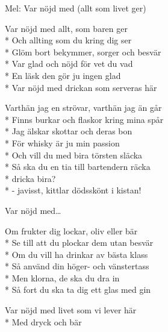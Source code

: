 \begin{SongText}
    \begin{SongInfo}
        Mel:  Var nöjd med (allt som livet ger)
    \end{SongInfo}
    \begin{SongVerse}
        Var nöjd med allt, som baren ger\\*%
        Och allting som du kring dig ser\\*%
        Glöm bort bekymmer, sorger och besvär\\*%
        Var glad och nöjd för vet du vad\\*%
        En läsk den gör ju ingen glad\\*%
        Var nöjd med drickan som serveras här
    \end{SongVerse}
    \begin{SongVerse}
        Varthän jag en strövar, varthän jag än går\\*%
        Finns burkar och flaskor kring mina spår\\*%
        Jag älskar skottar och deras bon\\*%
        För whisky är ju min passion\\*%
        Och vill du med bira törsten släcka\\*%
        Så ska du en tia till bartendern räcka\\*%
        dricka bira?\\*%
        - javisst, kittlar dödsskönt i kistan!
    \end{SongVerse}
    \begin{SongVerse}
        Var nöjd med…
    \end{SongVerse}
    \begin{SongVerse}
        Om frukter dig lockar, oliv eller bär\\*%
        Se till att du plockar dem utan besvär\\*%
        Om du vill ha drinkar av bästa klass\\*%
        Så använd din höger- och vänstertass\\*%
        Men klorna, de ska du dra in\\*%
        Så fort du ska ta dig ett glas med gin
    \end{SongVerse}
    \begin{SongVerse}
        Var nöjd med livet som vi lever här\\*%
        Med dryck och bär 
    \end{SongVerse}
\end{SongText}
